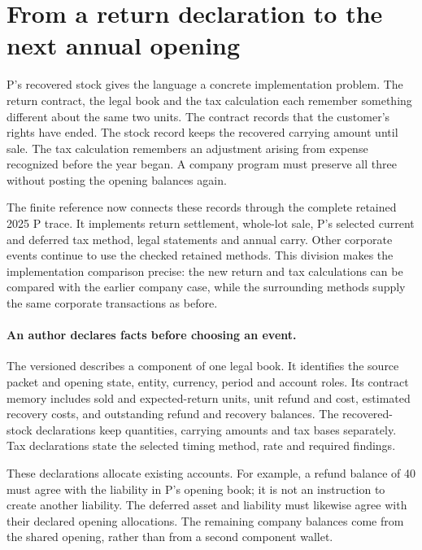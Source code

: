 \section{From a return declaration to the next annual opening}
\label{sec:company-return-reference}

P's recovered stock gives the language a concrete implementation problem.
The return contract, the legal book and the tax calculation each remember
something different about the same two units. The contract records that the
customer's rights have ended. The stock record keeps the recovered carrying
amount until sale. The tax calculation remembers an adjustment arising from
expense recognized before the year began. A company program must preserve
all three without posting the opening balances again.

The finite reference now connects these records through the complete retained
2025 P trace. It implements return settlement, whole-lot sale, P's selected
current and deferred tax method, legal statements and annual carry. Other
corporate events continue to use the checked retained methods. This division
makes the implementation comparison precise: the new return and tax
calculations can be compared with the earlier company case, while the
surrounding methods supply the same corporate transactions as before.

\paragraph{An author declares facts before choosing an event.}
The versioned \allowbreak{} describes a component of
one legal book. It identifies the source packet and opening state, entity,
currency, period and account roles. Its contract memory includes sold and
expected-return units, unit refund and cost, estimated recovery costs, and
outstanding refund and recovery balances. The recovered-stock declarations
keep quantities, carrying amounts and tax bases separately. Tax declarations
state the selected timing method, rate and required findings.

These declarations allocate existing accounts. For example, a refund balance
of 40 must agree with the liability in P's opening book; it is not an
instruction to create another liability. The deferred asset and liability
must likewise agree with their declared opening allocations. The remaining
company balances come from the shared opening, rather than from a second
component wallet.

